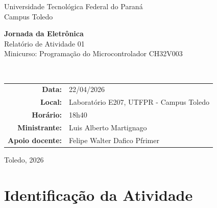 \documentclass[12pt,a4paper]{article}
\begin{document}
\begin{titlepage}
    \thispagestyle{empty}
    \begin{center}
        \vspace*{1.2cm}
        {\Large Universidade Tecnológica Federal do Paraná}\\
        {\large Campus Toledo}\\[1.6cm]

        \colorbox{utfpryellow}{%
            \begin{minipage}{0.88\textwidth}
                \centering
                \vspace{0.8cm}
                {\Huge\bfseries Jornada da Eletrônica}\\[0.3cm]
                {\Large Relatório de Atividade 01}\\[0.3cm]
                {\Large Minicurso: Programação do Microcontrolador CH32V003}
                \vspace{0.8cm}
            \end{minipage}
        }\\[1.8cm]

        \begin{tabular}{rl}
            \textbf{Data:} & 22/04/2026 \\
            \textbf{Local:} & Laboratório E207, UTFPR - Campus Toledo \\
            \textbf{Horário:} & 18h40 \\
            \textbf{Ministrante:} & Luis Alberto Martignago \\
            \textbf{Apoio docente:} & Felipe Walter Dafico Pfrimer \\
        \end{tabular}

        \vfill
        Toledo, 2026
    \end{center}
\end{titlepage}

\section{Identificação da Atividade}
\end{document}
